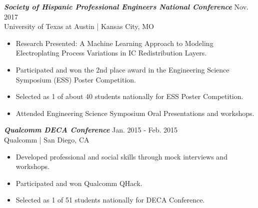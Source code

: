 \documentclass[letter]{res}
\begin{document}
\begin{resume}
\vspace{-2mm}

{\sl \textbf{Society of Hispanic Professional Engineers National Conference}} \hfill Nov. 2017\\
 University of Texas at Austin | Kansas City, MO \newline

 \vspace{-4mm}

 \begin{itemize}
 \item Research Presented: A Machine Learning Approach to Modeling Electroplating Process Variations in IC Redistribution Layers.
 \item Participated and won the 2nd place award in the Engineering Science Symposium (ESS) Poster Competition.
 \item Selected as 1 of about 40 students nationally for ESS Poster Competition.
 \item Attended Engineering Science Symposium Oral Presentations and workshops.
 \end{itemize}

\vspace{-2mm}

%
%
%

{\sl \textbf{Qualcomm DECA Conference}} \hfill Jan. 2015 - Feb. 2015\\
Qualcomm | San Diego, CA \newline

 \vspace{-4mm}

 \begin{itemize}
 \item Developed professional and social skills through mock interviews and workshops.
 \item Participated and won Qualcomm QHack.
 \item Selected as 1 of 51 students nationally for DECA Conference.
 \end{itemize}


\end{resume}
\end{document}

